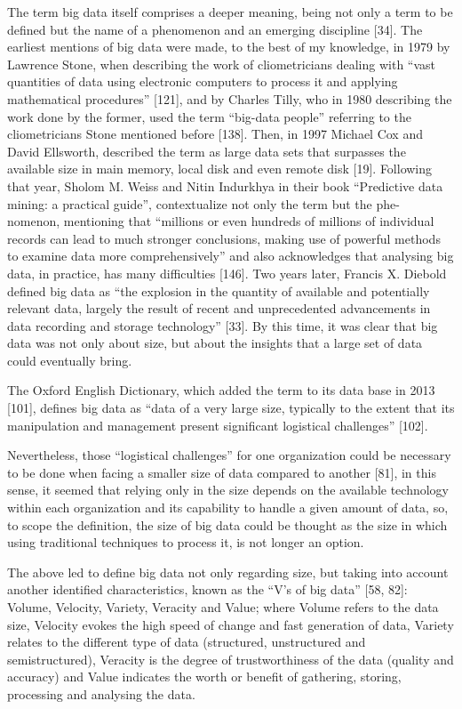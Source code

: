 The term big data itself comprises a deeper meaning, being not only a term to be
defined but the name of a phenomenon and an emerging discipline [34]. The earliest
mentions of big data were made, to the best of my knowledge, in 1979 by Lawrence
Stone, when describing the work of cliometricians dealing with “vast quantities of data
using electronic computers to process it and applying mathematical procedures” [121],
and by Charles Tilly, who in 1980 describing the work done by the former, used the
term “big-data people” referring to the cliometricians Stone mentioned before [138].
Then, in 1997 Michael Cox and David Ellsworth, described the term as large data
sets that surpasses the available size in main memory, local disk and even remote disk
[19]. Following that year, Sholom M. Weiss and Nitin Indurkhya in their book “Predictive data mining: a practical guide”, contextualize not only the term but the phe-
nomenon, mentioning that “millions or even hundreds of millions of individual records can lead to much stronger conclusions, making use of powerful methods to examine
data more comprehensively” and also acknowledges that analysing big data, in practice, has many difficulties [146]. Two years later, Francis X. Diebold defined big data
as “the explosion in the quantity of available and potentially relevant data, largely the
result of recent and unprecedented advancements in data recording and storage technology” [33]. By this time, it was clear that big data was not only about size, but about
the insights that a large set of data could eventually bring.

The Oxford English Dictionary, which added the term to its data base in 2013
[101], defines big data as “data of a very large size, typically to the extent that its
manipulation and management present significant logistical challenges” [102].

Nevertheless, those “logistical challenges” for one organization could be necessary
to be done when facing a smaller size of data compared to another [81], in this sense,
it seemed that relying only in the size depends on the available technology within
each organization and its capability to handle a given amount of data, so, to scope the
definition, the size of big data could be thought as the size in which using traditional
techniques to process it, is not longer an option. 

The above led to define big data not only regarding size, but taking into account
another identified characteristics, known as the “V’s of big data” [58, 82]: Volume,
Velocity, Variety, Veracity and Value; where Volume refers to the data size, Velocity
evokes the high speed of change and fast generation of data, Variety relates to the
different type of data (structured, unstructured and semistructured), Veracity is the
degree of trustworthiness of the data (quality and accuracy) and Value indicates the
worth or benefit of gathering, storing, processing and analysing the data.

